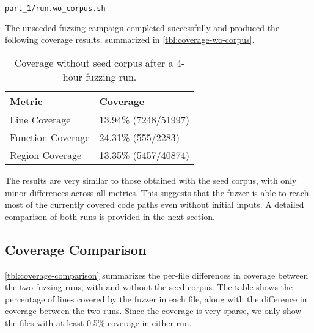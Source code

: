 \documentclass[11pt,a4paper,twocolumn]{article}
\begin{document}
\begin{lstlisting}[language=bash, caption=Bash command to run an automated fuzzing campaign without seed corpus]
part_1/run.wo_corpus.sh
\end{lstlisting}

The unseeded fuzzing campaign completed successfully and produced the following coverage results, summarized in \autoref{tbl:coverage-wo-corpus}.

\begin{table}[ht]
	\centering
	\begin{tabular}{@{}ll@{}}
		\toprule
		\textbf{Metric}   & \textbf{Coverage}    \\
		\midrule
		Line Coverage     & 13.94\% (7248/51997) \\
		Function Coverage & 24.31\% (555/2283)   \\
		Region Coverage   & 13.35\% (5457/40874) \\
		\bottomrule
	\end{tabular}
	\caption{Coverage without seed corpus after a 4-hour fuzzing run.}
	\label{tbl:coverage-wo-corpus}
\end{table}

The results are very similar to those obtained with the seed corpus, with only minor differences across all metrics. This suggests that the fuzzer is able to reach most of the currently covered code paths even without initial inputs. A detailed comparison of both runs is provided in the next section.

\subsection*{Coverage Comparison}
\label{sec:coverage-comparison}

\autoref{tbl:coverage-comparison} summarizes the per-file differences in coverage between the two fuzzing runs, with and without the seed corpus. The table shows the percentage of lines covered by the fuzzer in each file, along with the difference in coverage between the two runs. Since the coverage is very sparse, we only show the files with at least 0.5\% coverage in either run.
\end{document}
